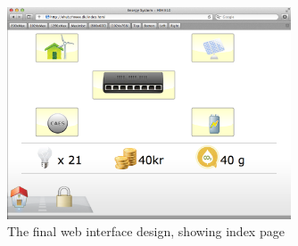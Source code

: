 \begin{figure}[H]
	\begin{centering}
		 \includegraphics[width=0.75\textwidth]{images/screen_index_page.png}
		\caption{The final web interface design, showing index page}
 	\end{centering}
\end{figure}

